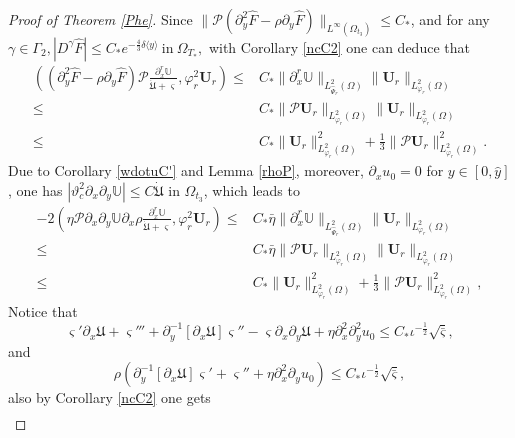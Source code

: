 \documentclass{amsart}
\numberwithin{equation}{section}
\newcommand\y{{{\langle y \rangle}}}
\begin{document}
\begin{proof}[Proof of Theorem \ref{Phe}]
Since $\|\mathcal{P}(\partial_{y}^{2}\hat{F}-\rho\partial_{y}\hat{F})\|_{L^{\infty}(\Omega_{t_{3}})}\leq C_{*}$,
and for any $\gamma\in\Gamma_{2}, |D^{\gamma}\hat{F}|\leq C_{*}e^{-\frac{4}{3}\delta\y}~\text{in}~\Omega_{T_{*}},$
with Corollary \ref{ncC2} one can deduce that
\begin{align}\label{J91}
\left((\partial_{y}^{2}\hat{F}-\rho\partial_{y}\hat{F})\mathcal{P}\frac{\partial_{x}^{r}\mathbb{U}}{\dot{\mathfrak{U}}+\varsigma},\varphi_{r}^{2}\mathbf{U}_{r}\right)
\leq& C_{*}\|\partial_{x}^{r}\mathbb{U}\|_{L_{\hat{\Psi}_{r}}^{2}(\Omega)}\|\mathbf{U}_{r}\|_{L_{\varphi_{r}}^{2}(\Omega)}\\
\leq& C_{*}\|\mathcal{P}\mathbf{U}_{r}\|_{L_{\varphi_{r}}^{2}(\Omega)}\|\mathbf{U}_{r}\|_{L_{\varphi_{r}}^{2}(\Omega)}\nonumber\\
\leq& C_{*}\|\mathbf{U}_{r}\|_{L_{\varphi_{r}}^{2}(\Omega)}^{2}
     +\frac{1}{3}\|\mathcal{P}\mathbf{U}_{r}\|_{L_{\varphi_{r}}^{2}(\Omega)}^{2}.\nonumber
\end{align}
Due to Corollary \ref{wdotuC'} and Lemma \ref{rhoP}, moreover, $\partial_{x}u_{0}=0$ for $y\in[0,\hat{y}]$, one has $|\vartheta_{c}^{2}\partial_{x}\partial_{y}\mathbb{U}|\leq C\dot{\mathfrak{U}}$ in $\Omega_{t_{3}}$, which leads to
\begin{align}\label{J92}
-2\left(\eta\mathcal{P}\partial_{x}\partial_{y}\mathbb{U}\partial_{x}\rho\frac{\partial_{x}^{r}\mathbb{U}}{\dot{\mathfrak{U}}+\varsigma},\varphi_{r}^{2}\mathbf{U}_{r}\right)
\leq& C_{*}\bar{\eta}\|\partial_{x}^{r}\mathbb{U}\|_{L_{\hat{\Psi}_{r}}^{2}(\Omega)}\|\mathbf{U}_{r}\|_{L_{\varphi_{r}}^{2}(\Omega)}\\
\leq& C_{*}\bar{\eta}\|\mathcal{P}\mathbf{U}_{r}\|_{L_{\varphi_{r}}^{2}(\Omega)}\|\mathbf{U}_{r}\|_{L_{\varphi_{r}}^{2}(\Omega)}\nonumber\\
\leq& C_{*}\|\mathbf{U}_{r}\|_{L_{\varphi_{r}}^{2}(\Omega)}^{2}
     +\frac{1}{3}\|\mathcal{P}\mathbf{U}_{r}\|_{L_{\varphi_{r}}^{2}(\Omega)}^{2},\nonumber
\end{align}
Notice that
$$\varsigma'\partial_{x}\mathfrak{U}+\varsigma'''+\partial_{y}^{-1}[\partial_{x}\mathfrak{U}]\varsigma''-\varsigma\partial_{x}\partial_{y}\mathfrak{U}+\eta\partial_{x}^{2}\partial_{y}^{2}u_{0}
\leq C_{*}\iota^{-\frac{1}{2}}\sqrt{\bar{\varsigma}},$$
and
$$\rho\left(\partial_{y}^{-1}[\partial_{x}\mathfrak{U}]\varsigma'+\varsigma''+\eta\partial_{x}^{2}\partial_{y}u_{0}\right)
\leq C_{*}\iota^{-\frac{1}{2}}\sqrt{\bar{\varsigma}},$$
also by Corollary \ref{ncC2} one gets
\begin{align}\label{J93}

\end{align}
\end{proof}
\end{document}
